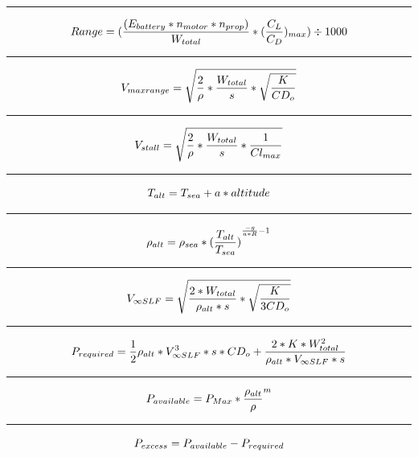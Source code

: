 \documentclass[12pt,A4paper]{article}
\begin{document}
		\hrule
		\vspace{0.1 in}
		\begin{equation}
			Range = (\frac{(E_{battery} * n_{motor} * n_{prop})}{W_{total}} * (\frac{C_L}{C_D})_{max}) \div 1000 \\
		\end{equation}
		\hrule
		\vspace{0.1 in}
		\begin{equation}
			V_{maxrange} = \sqrt{\frac{2}{\rho} * \frac{W_{total}}{s} * \sqrt{\frac{K}{CD_o}}}\\
		\end{equation}
		\hrule
		\vspace{0.1 in}
		\begin{equation}
			V_{stall} = \sqrt{\frac{2}{\rho}*\frac{W_{total}}{s}*\frac{1}{Cl_{max}}} \\
		\end{equation}
		\hrule
		\vspace{0.1 in}
		\begin{equation}
			T_{alt} = T_{sea} + a*altitude \\
		\end{equation}
		\hrule
		\vspace{0.1 in}
		\begin{equation}
			\rho_{alt} = \rho_{sea} * {(\frac{T_{alt}}{T_{sea}})}^{\frac{-g}{a*R}-1}\\
		\end{equation}
		\hrule
		\vspace{0.1 in}
		\begin{equation}
			V_{\infty SLF} = \sqrt{\frac{2*W_{total}}{\rho_{alt} * s} * \sqrt{\frac{K}{3CD_o}}}\\
		\end{equation}
		\hrule
		\vspace{0.1 in}
		\begin{equation}
			P_{required} = \frac{1}{2} \rho_{alt} * V_{\infty SLF}^3 * s * CD_o + \frac{2 * K * W_{total}^2}{\rho_{alt}*V_{\infty SLF}*s} \\
		\end{equation}
		\hrule
		\vspace{0.1 in}
		\begin{equation}
			P_{available} = P_{Max} * {\frac{\rho_{alt}}{\rho}}^m \\
		\end{equation}
		\hrule
		\vspace{0.1 in}
		\begin{equation}
			P_{excess} = P_{available} - P_{required} \\
		\end{equation}
\end{document}
